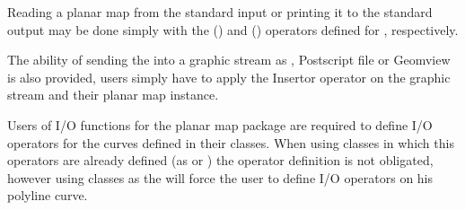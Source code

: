 Reading a planar map from the standard input or printing it to the
standard output may be done simply with the  (\ccc{ >>
}) and  (\ccc{ << }) operators defined for
, respectively. 


The ability of sending the  
into a graphic stream as , Postscript file or
Geomview is also provided, users simply have to apply the Insertor
operator on the graphic stream and their planar map instance.

Users of I/O functions for the planar map package are required to define I/O 
operators for the curves defined in their  classes. 
When using  classes in which this operators are already defined 
(as  or  ) the operator definition is not obligated, 
however using  classes as the  will force the user to define 
I/O operators on his polyline curve.

